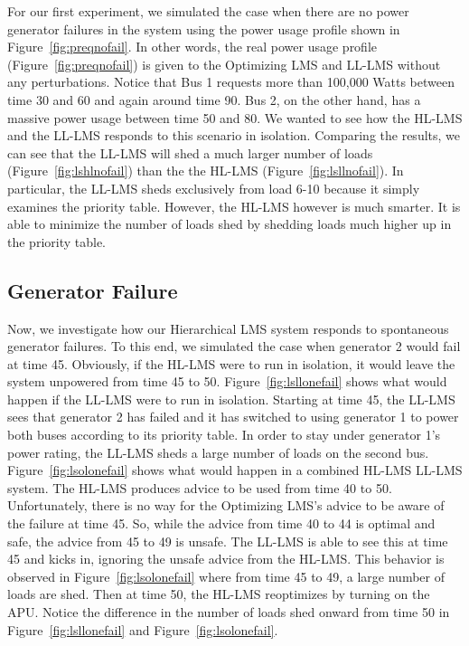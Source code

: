 \documentclass{acm_proc_article-sp}
\begin{document}
For our first experiment, we simulated the case when there are no power
generator failures in the system using the power usage profile shown in
Figure~\ref{fig:preqnofail}. 
In other words, the real power usage profile (Figure~\ref{fig:preqnofail}) is given to the Optimizing LMS and LL-LMS without any perturbations.
Notice that Bus 1 requests more than 100,000 Watts
between time 30 and 60 and again around time 90. Bus 2, on the other hand,
has a massive power usage between time 50 and 80. We wanted to see how the
HL-LMS and the LL-LMS responds to this scenario in isolation. 
Comparing the results, we can see that the LL-LMS will shed a much larger
number of loads (Figure~\ref{fig:lshlnofail}) than the the HL-LMS (Figure~\ref{fig:lsllnofail}). 
In particular, the LL-LMS sheds exclusively from load 6-10 because it simply examines the priority table.
However, the HL-LMS however is much smarter. It is able to minimize the number of
loads shed by shedding loads much higher up in the priority table.

\subsection{Generator Failure}
Now, we investigate how our Hierarchical LMS system responds to spontaneous generator failures. 
To this end, we
simulated the case when generator 2 would fail at time 45. Obviously, if the HL-LMS were
to run in isolation, it would leave the system unpowered from time 45 to 50. 
Figure~\ref{fig:lsllonefail} shows what would happen if the LL-LMS were to run in 
isolation. Starting at time 45, the LL-LMS sees that generator 2 has failed and it has 
switched to using generator 1 to power both buses according to its priority table. In order
to stay under generator 1's power rating, the LL-LMS sheds a large number of loads on the 
second bus. Figure~\ref{fig:lsolonefail} shows what would happen in a combined HL-LMS
LL-LMS system. The HL-LMS produces advice to be used from time 40 to 50. Unfortunately,
there is no way for the Optimizing LMS's advice to be aware of the failure at time 45. So, while the advice
from time 40 to 44 is optimal and safe, the advice from 45 to 49 is unsafe. The LL-LMS is
able to see this at time 45 and kicks in, ignoring the unsafe advice from the HL-LMS. This
behavior is observed in Figure~\ref{fig:lsolonefail} where from time 45 to 49, a large
number of loads are shed. Then at time 50, the HL-LMS reoptimizes by turning on the APU.
Notice the difference in the number of loads shed onward from time 50 in 
Figure~\ref{fig:lsllonefail} and Figure~\ref{fig:lsolonefail}.
\end{document}
